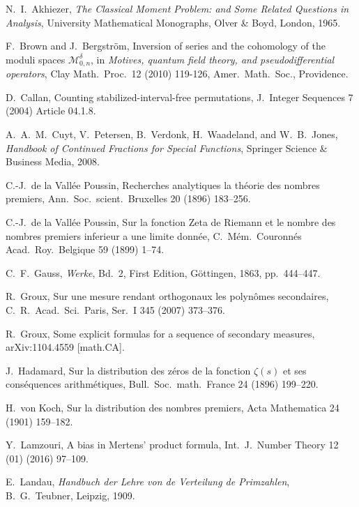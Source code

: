 \documentclass[12pt]{article}
\begin{document}
\begin{thebibliography}{}

 N.\ I.\  Akhiezer, {\it The Classical Moment Problem: and Some Related Questions in Analysis}, University Mathematical Monographs, Olver \& Boyd, London, 1965.

 F.\ Brown and J.\ Bergstr\"om, Inversion of series and the cohomology of the moduli spaces ${\mathcal M}^\delta_{0,n}$, in {\it Motives, quantum field theory, and pseudodifferential operators}, Clay Math.\ Proc.\ 12 (2010) 119-126, Amer.\ Math.\ Soc., Providence.


 D.\ Callan, Counting stabilized-interval-free permutations, J.\ Integer Sequences 7 (2004) Article 04.1.8.

 A.\ A.\ M.\ Cuyt, V.\ Petersen, B.\ Verdonk, H.\ Waadeland, and W.\ B.\ Jones, {\it Handbook of Continued Fractions for Special Functions}, Springer Science \& Business Media, 2008.

 C.-J.\ de la Vall\'ee Poussin, Recherches analytiques la th\'eorie des nombres premiers,  Ann.\ Soc.\ scient.\ Bruxelles 20 (1896) 183--256.

  C.-J.\ de la Vall\'ee Poussin, Sur la fonction Zeta de Riemann et le nombre des nombres premiers inferieur a une limite donn\'ee, C.\ M\'em.\ Couronn\'es Acad.\ Roy.\ Belgique 59 (1899) 1--74.


  C.\ F.\ Gauss, {\it Werke}, Bd.\ 2, First Edition, G\"ottingen, 1863, pp.\ 444--447.

 R.\ Groux, Sur une mesure rendant orthogonaux les polyn\^{o}mes secondaires, C.\ R.\ Acad.\ Sci.\ Paris, Ser.\ I 345 (2007) 373--376.

   R.\ Groux, Some explicit formulas for a sequence of secondary measures, arXiv:1104.4559 [math.CA].


 J.\ Hadamard,  Sur la distribution des z\'eros de la fonction $\zeta(s)$ et ses cons\'equences arithm\'etiques,  Bull.\ Soc.\ math.\ France 24 (1896) 199--220.


  H.\ von Koch, Sur la distribution des nombres premiers, Acta Mathematica
24 (1901) 159--182.


  Y.\ Lamzouri, A bias in Mertens’ product formula, Int.\ J.\ Number Theory 12 (01) (2016) 97--109.

  E.\ Landau, {\it Handbuch der Lehre von de Verteilung de Primzahlen}, B.\ G.\ Teubner, Leipzig, 1909.




\end{thebibliography}
\end{document}
